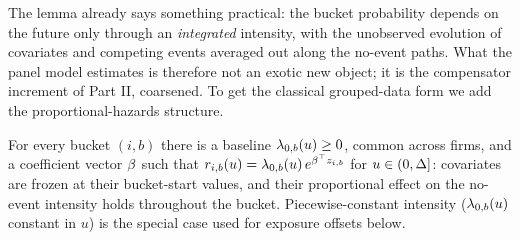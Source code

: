 The lemma already says something practical: the bucket probability
depends on the future only through an \emph{integrated} intensity, with
the unobserved evolution of covariates and competing events averaged out
along the no-event paths. What the panel model estimates is therefore not
an exotic new object; it is the compensator increment of Part II, coarsened.
To get the classical grouped-data form we add the proportional-hazards
structure.

\begin{assumption}\label{asm:ch09:groupedph}
For every bucket $(i,b)$ there is a baseline $\lambda_{0,b}(u) \ge 0$,
common across firms, and a coefficient vector $\beta$ such that
$r_{i,b}(u) = \lambda_{0,b}(u)\, e^{\beta^{\top} z_{i,b}}$ for
$u \in (0,\Delta]$: covariates are frozen at their bucket-start values,
and their proportional effect on the no-event intensity holds throughout
the bucket. Piecewise-constant intensity ($\lambda_{0,b}(u)$ constant in
$u$) is the special case used for exposure offsets below.
\end{assumption}

